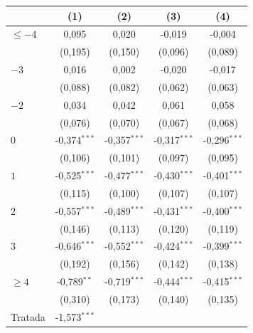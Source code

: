 \begingroup
\centering
\begin{tabular}{lcccc}
   \toprule
                          & (1)            & (2)            & (3)            & (4)\\  
   \midrule 
   $\leq -4$              & 0{,}095          & 0{,}020          & -0{,}019         & -0{,}004\\   
                          & (0{,}195)        & (0{,}150)        & (0{,}096)        & (0{,}089)\\   
   $-3$                   & 0{,}016          & 0{,}002          & -0{,}020         & -0{,}017\\   
                          & (0{,}088)        & (0{,}082)        & (0{,}062)        & (0{,}063)\\   
   $-2$                   & 0{,}034          & 0{,}042          & 0{,}061          & 0{,}058\\   
                          & (0{,}076)        & (0{,}070)        & (0{,}067)        & (0{,}068)\\   
   $0$                    & -0{,}374$^{***}$ & -0{,}357$^{***}$ & -0{,}317$^{***}$ & -0{,}296$^{***}$\\   
                          & (0{,}106)        & (0{,}101)        & (0{,}097)        & (0{,}095)\\   
   $1$                    & -0{,}525$^{***}$ & -0{,}477$^{***}$ & -0{,}430$^{***}$ & -0{,}401$^{***}$\\   
                          & (0{,}115)        & (0{,}100)        & (0{,}107)        & (0{,}107)\\   
   $2$                    & -0{,}557$^{***}$ & -0{,}489$^{***}$ & -0{,}431$^{***}$ & -0{,}400$^{***}$\\   
                          & (0{,}146)        & (0{,}113)        & (0{,}120)        & (0{,}119)\\   
   $3$                    & -0{,}646$^{***}$ & -0{,}552$^{***}$ & -0{,}424$^{***}$ & -0{,}399$^{***}$\\   
                          & (0{,}192)        & (0{,}156)        & (0{,}142)        & (0{,}138)\\   
   $\geq 4$               & -0{,}789$^{**}$  & -0{,}719$^{***}$ & -0{,}444$^{***}$ & -0{,}415$^{***}$\\   
                          & (0{,}310)        & (0{,}173)        & (0{,}140)        & (0{,}135)\\   
   Tratada                & -1{,}573$^{***}$ &                &                &   \\   

\end{tabular}
